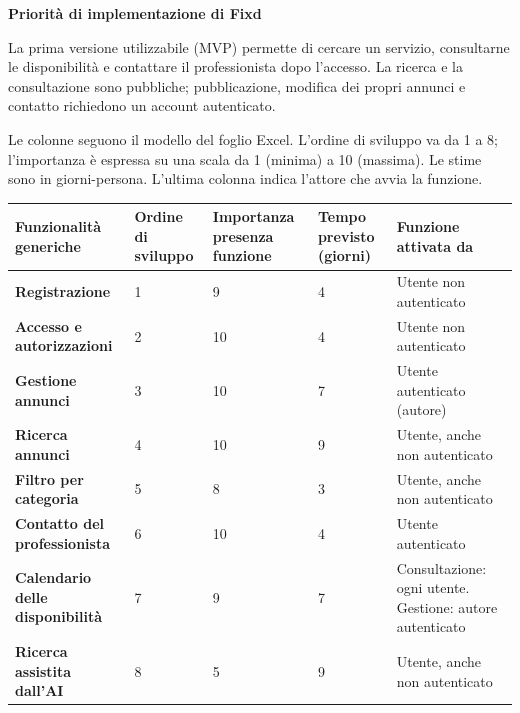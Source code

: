 \documentclass[a4paper,11pt]{article}
\begin{document}
\begin{center}
  {\LARGE\bfseries\color{fixdblue} Priorità di implementazione di Fixd\par}

\end{center}

La prima versione utilizzabile (MVP) permette di cercare un servizio,
consultarne le disponibilità e contattare il professionista dopo l'accesso.
La ricerca e la consultazione sono pubbliche; pubblicazione, modifica dei
propri annunci e contatto richiedono un account autenticato.

Le colonne seguono il modello del foglio Excel. L'ordine di sviluppo va
 da 1 a 8; l'importanza è espressa su una scala da 1 (minima) a 10
 (massima). Le stime sono in giorni-persona.
 L'ultima colonna indica l'attore che avvia la funzione.

\medskip
{\small
\setlength{\tabcolsep}{3pt}
\renewcommand{\arraystretch}{1.2}
\begin{tabularx}{\linewidth}{@{}YC{1.7cm}C{2.1cm}C{2.1cm}L{4.0cm}@{}}
  \toprule
  \textbf{Funzionalità generiche} & \textbf{Ordine di sviluppo} &
  \textbf{Importanza presenza funzione} & \textbf{Tempo previsto (giorni)} &
  \textbf{Funzione attivata da} \\
  \midrule
  \textbf{Registrazione} & 1 & 9 & 4 & Utente non autenticato \\
  \addlinespace[5pt]
  \textbf{Accesso e autorizzazioni} & 2 & 10 & 4 & Utente non autenticato \\
  \addlinespace[5pt]
  \textbf{Gestione annunci} & 3 & 10 & 7 & Utente autenticato (autore) \\
  \addlinespace[5pt]
  \textbf{Ricerca annunci} & 4 & 10 & 9 & Utente, anche non autenticato \\
  \addlinespace[5pt]
  \textbf{Filtro per categoria} & 5 & 8 & 3 & Utente, anche non autenticato \\
  \addlinespace[5pt]
  \textbf{Contatto del professionista} & 6 & 10 & 4 & Utente autenticato \\
  \addlinespace[5pt]
  \textbf{Calendario delle disponibilità} & 7 & 9 & 7 & Consultazione: ogni utente. Gestione: autore autenticato \\
  \addlinespace[5pt]
  \textbf{Ricerca assistita dall'AI} & 8 & 5 & 9 & Utente, anche non autenticato \\
  \bottomrule
\end{tabularx}
\par}

\medskip
\end{document}

